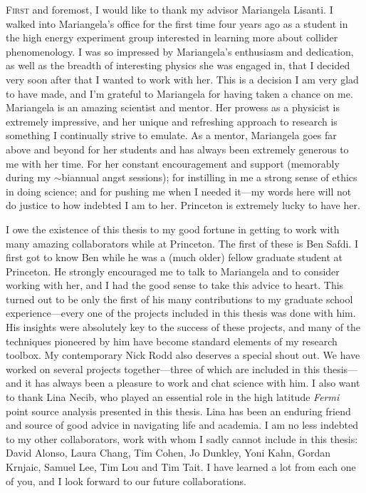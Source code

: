 


\lettrine[lines=3]{F}{irst} and foremost, I would like to thank my advisor Mariangela Lisanti. I walked into Mariangela's office for the first time four years ago as a student in the high energy experiment group interested in learning more about collider phenomenology. I was so impressed by Mariangela's enthusiasm and dedication, as well as the breadth of interesting physics she was engaged in, that I decided very soon after that I wanted to work with her. This is a decision I am very glad to have made, and I'm grateful to Mariangela for having taken a chance on me. Mariangela is an amazing scientist and mentor. Her prowess as a physicist is extremely impressive, and her unique and refreshing approach to research is something I continually strive to emulate. As a mentor, Mariangela goes far above and beyond for her students and has always been extremely generous to me with her time. For her constant encouragement and support (memorably during my $\sim$biannual angst sessions); for instilling in me a strong sense of ethics in doing science; and for pushing me when I needed it---my words here will not do justice to how indebted I am to her. Princeton is extremely lucky to have her.

I owe the existence of this thesis to my good fortune in getting to work with many amazing collaborators while at Princeton. The first of these is Ben Safdi. I first got to know Ben while he was a (much older) fellow graduate student at Princeton. He strongly encouraged me to talk to Mariangela and to consider working with her, and I had the good sense to take this advice to heart. This turned out to be only the first of his many contributions to my graduate school experience---every one of the projects included in this thesis was done with him. His insights were absolutely key to the success of these projects, and many of the techniques pioneered by him have become standard elements of my research toolbox. My contemporary Nick Rodd also deserves a special shout out. We have worked on several projects together---three of which are included in this thesis---and it has always been a pleasure to work and chat science with him. I also want to thank Lina Necib, who played an essential role in the high latitude \emph{Fermi} point source analysis presented in this thesis. Lina has been an enduring friend and source of good advice in navigating life and academia. I am no less indebted to my other collaborators, work with whom I sadly cannot include in this thesis: David Alonso, Laura Chang, Tim Cohen, Jo Dunkley, Yoni Kahn, Gordan Krnjaic, Samuel Lee, Tim Lou and Tim Tait. I have learned a lot from each one of you, and I look forward to our future collaborations. 

